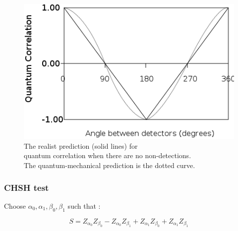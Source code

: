 \documentclass{article}
\begin{document}

\begin{figure}[h]
    \centering
    \captionsetup{justification=justified,margin=3cm}
    \includegraphics[scale=0.6]{lhv-correlation.png}
    \caption{\quad The realist prediction (solid lines) for\\quantum correlation
            when there are no non-detections.\\
            The quantum-mechanical prediction is the dotted curve.}
\end{figure}


\subsubsection*{CHSH test}
Choose $\alpha_0, \alpha_1, \beta_0, \beta_1$ such that :

\begin{equation}
    \label{def-s-lhv}
    S = Z_{\alpha_0}Z_{\beta_0}
        - Z_{\alpha_0}Z_{\beta_1}
        + Z_{\alpha_1}Z_{\beta_0}
        + Z_{\alpha_1}Z_{\beta_1}
\end{equation}
\end{document}
